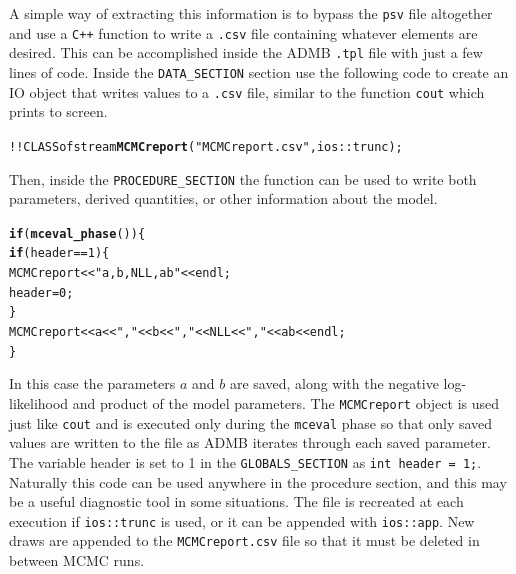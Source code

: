 \documentclass{article}\usepackage[]{graphicx}\usepackage[]{color}
\makeatletter
\newcommand{\hlstr}[1]{\textcolor[rgb]{0.192,0.494,0.8}{#1}}%
\newcommand{\hlkwd}[1]{\textcolor[rgb]{0.737,0.353,0.396}{\textbf{#1}}}%
\newenvironment{kframe}{%
 \def\at@end@of@kframe{}%
 \ifinner\ifhmode%
  \def\at@end@of@kframe{\end{minipage}}%
  \begin{minipage}{\columnwidth}%
 \fi\fi%
 \def\FrameCommand##1{\hskip\@totalleftmargin \hskip-\fboxsep
 \colorbox{shadecolor}{##1}\hskip-\fboxsep
     \hskip-\linewidth \hskip-\@totalleftmargin \hskip\columnwidth}%
 \MakeFramed {\advance\hsize-\width
   \@totalleftmargin\z@ \linewidth\hsize
   \@setminipage}}%
 {\par\unskip\endMakeFramed%
 \at@end@of@kframe}
\newenvironment{knitrout}{}{} %
\makeatother
\begin{document}
A simple way of extracting this information is to bypass the
\texttt{psv} file altogether and use a \texttt{C++} function
to write a \texttt{.csv} file containing whatever elements
are desired. This can be accomplished inside the ADMB
\texttt{.tpl} file with just a few lines of code. Inside the
\texttt{DATA\_SECTION} section use the following code to
create an IO object that writes values to a \texttt{.csv}
file, similar to the function \texttt{cout} which prints to
screen.
\begin{knitrout}
\color{fgcolor}\begin{kframe}
\begin{alltt}
  !!CLASS ofstream \hlkwd{MCMCreport}(\hlstr{"MCMCreport.csv"},ios::trunc);
\end{alltt}
\end{kframe}
\end{knitrout}
Then, inside the \texttt{PROCEDURE\_SECTION} the function
can be used to write both parameters, derived quantities, or
other information about the model.
\begin{knitrout}
\color{fgcolor}\begin{kframe}
\begin{alltt}
  \hlkwd{if}(\hlkwd{mceval_phase}())\{
    \hlkwd{if}(header==1) \{
        MCMCreport << \hlstr{"a,b,NLL,ab"} << endl;
        header=0;
    \}
    MCMCreport << a <<\hlstr{","} << b << \hlstr{","} << NLL << \hlstr{","} << ab << endl;
  \}
\end{alltt}
\end{kframe}
\end{knitrout}

In this case the parameters $a$ and $b$ are saved, along with the negative
log-likelihood and product of the model parameters.  The
\texttt{MCMCreport} object is used just like \texttt{cout} and is executed
only during the \texttt{mceval} phase so that only saved values are written
to the file as ADMB iterates through each saved parameter. The variable
header is set to 1 in the \texttt{GLOBALS\_SECTION} as \texttt{int header =
  1;}. Naturally this code can be used anywhere in the procedure section,
and this may be a useful diagnostic tool in some situations. The file is
recreated at each execution if \texttt{ios::trunc} is used, or it can be
appended with \texttt{ios::app}. New draws are appended to the
\texttt{MCMCreport.csv} file so that it must be deleted in between MCMC
runs.
\end{document}
